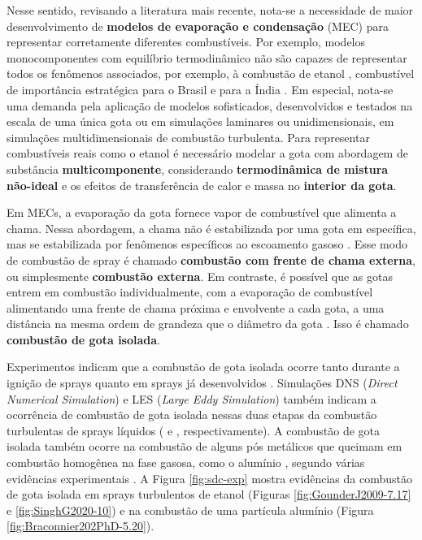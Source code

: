 Nesse sentido, revisando a literatura mais recente, nota-se a necessidade de maior desenvolvimento de \textbf{modelos de evaporação e condensação} (MEC) para representar corretamente diferentes combustíveis.
Por exemplo, modelos monocomponentes com equilíbrio termodinâmico não são capazes de representar todos os fenômenos associados, por exemplo, à combustão de etanol \cite{SacomanoF2024CF}, combustível de importância estratégica para o Brasil e para a Índia \cite{etanol-BNDES,etanol-India}.
Em especial, nota-se uma demanda pela aplicação de modelos sofisticados, desenvolvidos e testados na escala de uma única gota ou em simulações
laminares ou unidimensionais, em simulações multidimensionais de combustão turbulenta.
Para representar combustíveis reais como o etanol é necessário modelar a gota com abordagem de substância \textbf{multicomponente}, considerando \textbf{termodinâmica de mistura não-ideal} e os efeitos de transferência de calor e massa no \textbf{interior da gota}.

Em MECs, a evaporação da gota fornece vapor de combustível que alimenta a chama.
Nessa abordagem, a chama não é estabilizada por uma gota em específica, mas se estabilizada por fenômenos específicos ao escoamento gasoso \cite{ChiuH1982,Law2006}.
Esse modo de combustão de spray é chamado \textbf{combustão com frente de chama externa}, ou simplesmente \textbf{combustão externa}.
Em contraste, é possível que as gotas entrem em combustão individualmente, com a evaporação de combustível alimentando uma frente de chama próxima e envolvente a cada gota, a uma distância na mesma ordem de grandeza que o diâmetro da gota \cite{ChiuH1977}.
Isso é chamado \textbf{combustão de gota isolada}.

Experimentos indicam que a combustão de gota isolada ocorre tanto durante a ignição	de sprays \cite{AggarwalS2014} quanto em sprays já desenvolvidos \cite{ChenG1996CF,SinghG2020,GounderJ2009PhD}.
Simulações DNS (\emph{Direct Numerical Simulation}) e LES (\emph{Large Eddy Simulation}) também indicam a ocorrência de combustão de gota isolada nessas duas etapas da combustão turbulentas de sprays líquidos (\cite{BorghesiG2013CF} e \cite{PaulhiacD2020,BojkoDesJardin2017CF}, respectivamente).
A combustão de gota isolada também ocorre na combustão de alguns pós metálicos que queimam em combustão homogênea na fase gasosa, como o alumínio \cite{Bergthorson2015,Julien2017,Baumann2020}, segundo várias evidências experimentais \cite{Braconnier2020Pre,Braconnier2022,Bucher1999,Halter2023}.
A Figura \ref{fig:sdc-exp} mostra evidências da combustão de gota isolada em sprays turbulentos de etanol (Figuras \ref{fig:GounderJ2009-7.17} e \ref{fig:SinghG2020-10}) e na combustão de uma partícula alumínio (Figura \ref{fig:Braconnier202PhD-5.20}). %

